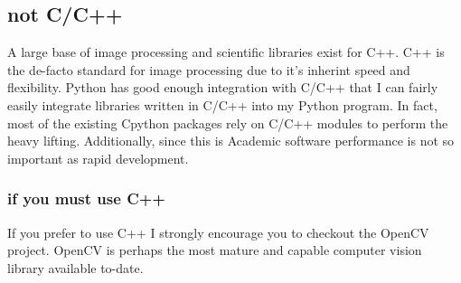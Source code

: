 \subsection{not C/C++}
A large base of image processing and scientific libraries exist for C++. C++ is the de-facto standard for image processing due to it's inherint speed and flexibility. Python has good enough integration with C/C++ that I can fairly easily integrate libraries written in C/C++ into my Python program.  In fact, most of the existing Cpython packages rely on C/C++ modules to perform the heavy lifting.  Additionally, since this is Academic software performance is not so important as rapid development.

\subsubsection{if you must use C++}
If you prefer to use C++ I strongly encourage you to checkout the OpenCV project. OpenCV is perhaps the most mature and capable computer vision library  available to-date.

\newpage
